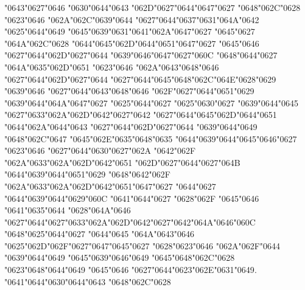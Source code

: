 {\char"0643}{\char"0627}{\char"0646} {\char"0630}{\char"0644}{\char"0643} {\char"062D}{\char"0627}{\char"0644}{\char"0647}{\char"0627} {\char"0648}{\char"062C}{\char"0628} {\char"0623}{\char"0646} {\char"062A}{\char"062C}{\char"0639}{\char"0644} {\char"0627}{\char"0644}{\char"0637}{\char"0631}{\char"064A}{\char"0642} {\char"0625}{\char"0644}{\char"0649} {\char"0645}{\char"0639}{\char"0631}{\char"0641}{\char"062A}{\char"0647}{\char"0627} {\char"0645}{\char"0627} {\char"064A}{\char"062C}{\char"0628} {\char"0644}{\char"0645}{\char"062D}{\char"0644}{\char"0651}{\char"0647}{\char"0627} {\char"0645}{\char"0646} {\char"0627}{\char"0644}{\char"062D}{\char"0627}{\char"0644} {\char"0639}{\char"0646}{\char"0647}{\char"0627}{\char"060C} {\char"0648}{\char"0644}{\char"0627} {\char"064A}{\char"0635}{\char"062D}{\char"0651} {\char"0623}{\char"0646} {\char"062A}{\char"0643}{\char"0648}{\char"0646} {\char"0627}{\char"0644}{\char"062D}{\char"0627}{\char"0644} {\char"0627}{\char"0644}{\char"0645}{\char"0648}{\char"062C}{\char"064E}{\char"0628}{\char"0629} {\char"0639}{\char"0646} {\char"0627}{\char"0644}{\char"0643}{\char"0648}{\char"0646} {\char"062F}{\char"0627}{\char"0644}{\char"0651}{\char"0629} {\char"0639}{\char"0644}{\char"064A}{\char"0647}{\char"0627} {\char"0625}{\char"0644}{\char"0627} {\char"0625}{\char"0630}{\char"0627} {\char"0639}{\char"0644}{\char"0645} {\char"0627}{\char"0633}{\char"062A}{\char"062D}{\char"0642}{\char"0627}{\char"0642} {\char"0627}{\char"0644}{\char"0645}{\char"062D}{\char"0644}{\char"0651} {\char"0644}{\char"062A}{\char"0644}{\char"0643} {\char"0627}{\char"0644}{\char"062D}{\char"0627}{\char"0644} {\char"0639}{\char"0644}{\char"0649} {\char"0648}{\char"062C}{\char"0647} {\char"0645}{\char"062E}{\char"0635}{\char"0648}{\char"0635} {\char"0644}{\char"0639}{\char"0644}{\char"0645}{\char"0646}{\char"0627} {\char"0623}{\char"0646} {\char"0627}{\char"0644}{\char"0630}{\char"0627}{\char"062A} {\char"0642}{\char"062F} {\char"062A}{\char"0633}{\char"062A}{\char"062D}{\char"0642}{\char"0651} {\char"062D}{\char"0627}{\char"0644}{\char"0627}{\char"064B} {\char"0644}{\char"0639}{\char"0644}{\char"0651}{\char"0629} {\char"0648}{\char"0642}{\char"062F} {\char"062A}{\char"0633}{\char"062A}{\char"062D}{\char"0642}{\char"0651}{\char"0647}{\char"0627} {\char"0644}{\char"0627} {\char"0644}{\char"0639}{\char"0644}{\char"0629}{\char"060C} {\char"0641}{\char"0644}{\char"0627} {\char"0628}{\char"062F} {\char"0645}{\char"0646} {\char"0641}{\char"0635}{\char"0644} {\char"0628}{\char"064A}{\char"0646} {\char"0627}{\char"0644}{\char"0627}{\char"0633}{\char"062A}{\char"062D}{\char"0642}{\char"0627}{\char"0642}{\char"064A}{\char"0646}{\char"060C} {\char"0648}{\char"0625}{\char"0644}{\char"0627} {\char"0644}{\char"0645} {\char"064A}{\char"0643}{\char"0646} {\char"0625}{\char"062D}{\char"062F}{\char"0627}{\char"0647}{\char"0645}{\char"0627} {\char"0628}{\char"0623}{\char"0646} {\char"062A}{\char"062F}{\char"0644} {\char"0639}{\char"0644}{\char"0649} {\char"0645}{\char"0639}{\char"0646}{\char"0649} {\char"0645}{\char"0648}{\char"062C}{\char"0628} {\char"0623}{\char"0648}{\char"0644}{\char"0649} {\char"0645}{\char"0646} {\char"0627}{\char"0644}{\char"0623}{\char"062E}{\char"0631}{\char"0649}. {\char"0641}{\char"0644}{\char"0630}{\char"0644}{\char"0643} {\char"0648}{\char"062C}{\char"0628} 